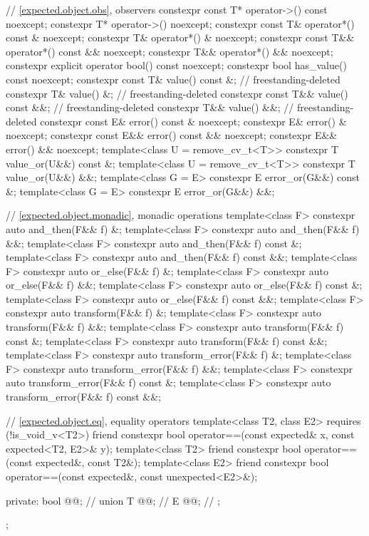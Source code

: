 \begin{codeblock}
{{    // \ref{expected.object.obs}, observers
    constexpr const T* operator->() const noexcept;
    constexpr T* operator->() noexcept;
    constexpr const T& operator*() const & noexcept;
    constexpr T& operator*() & noexcept;
    constexpr const T&& operator*() const && noexcept;
    constexpr T&& operator*() && noexcept;
    constexpr explicit operator bool() const noexcept;
    constexpr bool has_value() const noexcept;
    constexpr const T& value() const &;                                     // freestanding-deleted
    constexpr T& value() &;                                                 // freestanding-deleted
    constexpr const T&& value() const &&;                                   // freestanding-deleted
    constexpr T&& value() &&;                                               // freestanding-deleted
    constexpr const E& error() const & noexcept;
    constexpr E& error() & noexcept;
    constexpr const E&& error() const && noexcept;
    constexpr E&& error() && noexcept;
    template<class U = remove_cv_t<T>> constexpr T value_or(U&&) const &;
    template<class U = remove_cv_t<T>> constexpr T value_or(U&&) &&;
    template<class G = E> constexpr E error_or(G&&) const &;
    template<class G = E> constexpr E error_or(G&&) &&;

    // \ref{expected.object.monadic}, monadic operations
    template<class F> constexpr auto and_then(F&& f) &;
    template<class F> constexpr auto and_then(F&& f) &&;
    template<class F> constexpr auto and_then(F&& f) const &;
    template<class F> constexpr auto and_then(F&& f) const &&;
    template<class F> constexpr auto or_else(F&& f) &;
    template<class F> constexpr auto or_else(F&& f) &&;
    template<class F> constexpr auto or_else(F&& f) const &;
    template<class F> constexpr auto or_else(F&& f) const &&;
    template<class F> constexpr auto transform(F&& f) &;
    template<class F> constexpr auto transform(F&& f) &&;
    template<class F> constexpr auto transform(F&& f) const &;
    template<class F> constexpr auto transform(F&& f) const &&;
    template<class F> constexpr auto transform_error(F&& f) &;
    template<class F> constexpr auto transform_error(F&& f) &&;
    template<class F> constexpr auto transform_error(F&& f) const &;
    template<class F> constexpr auto transform_error(F&& f) const &&;

    // \ref{expected.object.eq}, equality operators
    template<class T2, class E2> requires (!is_void_v<T2>)
      friend constexpr bool operator==(const expected& x, const expected<T2, E2>& y);
    template<class T2>
      friend constexpr bool operator==(const expected&, const T2&);
    template<class E2>
      friend constexpr bool operator==(const expected&, const unexpected<E2>&);

  private:
    bool @@;       // \expos
    union {
      T @@;            // \expos
      E @@;           // \expos
    };
  };
}
\end{codeblock}

